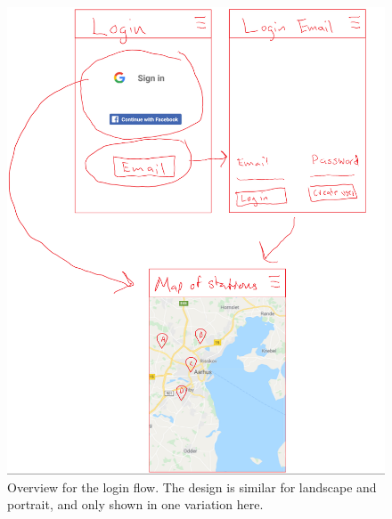 \begin{figure}[h]
	\centering
	\includegraphics[width=\textwidth]{Login.png}
	\caption{Overview for the login flow. The design is similar for landscape and portrait, and only shown in one variation here.}
	\label{fig:login}
\end{figure}
